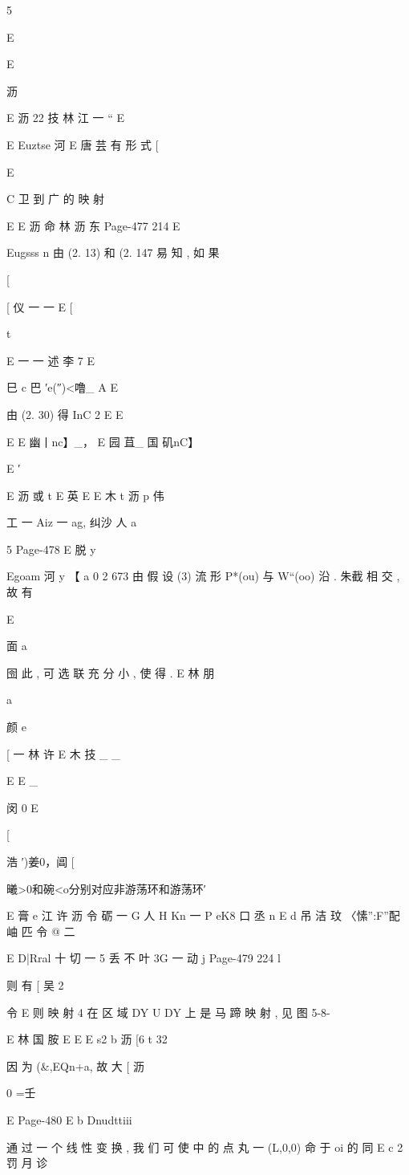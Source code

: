 {{{5

E

E

沥

E 沥 22 技 林 江 一 “
E

E
Euztse 河 E 唐 芸
有 形 式
[

E

C 卫 到 广 的 映 射

E
E 沥 命 林 沥 东
Page-477
214 E

Eugsss
n
由 (2. 13) 和 (2. 147 易 知 , 如 果

[

[ 仪 一 一
E
[

t

E 一 一 述
李 7
E

巳 c 巴
′e(″)<噜_ A E

由 (2. 30) 得
InC 2 E
E

E
E
幽丨nc】_， E 园 苴_ 国 矶nC】

E ′

E 沥 或 t
E 英
E
E 木 t 沥 p
伟

工 一 Aiz 一 ag,
纠沙 人 a

5
Page-478
E 脱 y

Egoam 河 y
【 a 0 2 673
由 假 设 (3) 流 形 P*(ou) 与 W“(oo) 沿 . 朱截 相 交 , 故 有

E

面 a

囹 此 , 可 选 联 充 分 小 , 使 得 .
E 林 朋

a

颜 e

[ 一 林 许
E 木
技 _ _

E
E _

闵 0 E

[

浩 ′)姜0，阊 [

曦>0和碗<o分别对应非游荡环和游荡环′

E 膏 e 江 许 沥
令
砺 一 G 人 H Kn 一 P eK8 口 丞 n
E d 吊 洁 玟
〈愫”:F”配岫 匹
令
@ 二 { E D|Rral 十 切 一 5 丢 不 叶 3G 一 动 j
Page-479
224 l

则 有
[ 吴 2

令
E
则 映 射 4 在 区 域 DY U DY 上 是 马 蹄 映 射 , 见 图 5-8-

E 林 国 胺
E
E
E s2
b 沥
[6 t 32

因 为 (&,EQn+a, 故
大 [ 沥

0 =壬

E
Page-480
E b
Dnudttiii

通 过 一 个 线 性 变 换 , 我 们 可 使 中 的 点 丸 一 (L,0,0) 命 于 oi 的 同
E
c 2 罚 月 诊

}}}}

